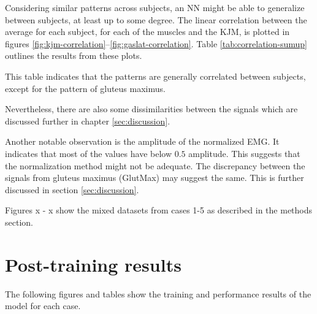 \documentclass[../main.tex]{subfiles}
\begin{document}
Considering similar patterns across subjects, an \ac{NN} might be able to generalize between subjects, at least up to some degree.
The linear correlation between the average for each subject, for each of the muscles and the \ac{KJM}, is plotted in figures \ref{fig:kjm-correlation}--\ref{fig:gaslat-correlation}.
Table \ref{tab:correlation-sumup} outlines the results from these plots.

This table indicates that the patterns are generally correlated between subjects, except for the pattern of gluteus maximus.


Nevertheless, there are also some dissimilarities between the signals which are discussed further in chapter \ref{sec:discussion}.

Another notable observation is the amplitude of the normalized \ac{EMG}.
It indicates that most of the values have below $0.5$ amplitude.
This suggests that the normalization method might not be adequate.
The discrepancy between the signals from gluteus maximus (GlutMax) may suggest the same. 
This is further discussed in section \ref{sec:discussion}.

Figures x - x show the mixed datasets from cases 1-5 as described in the methods section.

\section{Post-training results}
\label{sec:post-training-results}
The following figures and tables show the training and performance results of the model for each case.
\end{document}
